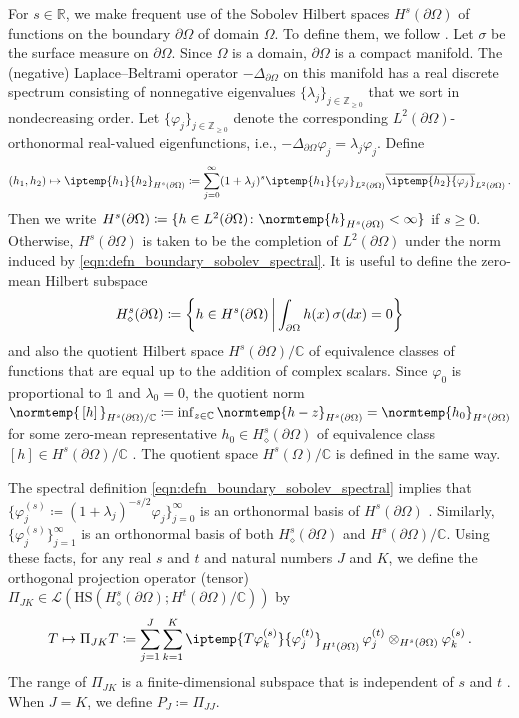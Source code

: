 \documentclass[pdflatex,sn-mathphys-num]{sn-jnl-preprint}
\let\originalleft\left %
\let\originalright\right
\renewcommand{\left}{\mathopen{}\mathclose\bgroup\originalleft}
\renewcommand{\right}{\aftergroup\egroup\originalright}
\newcommand{\Z}{\mathbb{Z}}
\newcommand{\R}{\mathbb{R}}
\newcommand{\C}{\mathbb{C}}
\newcommand{\sL}{\mathscr{L}}
\newcommand{\pOmega}{{\partial\Omega}}
\newcommand{\ip}{\iptemp}
\newcommand{\norm}{\normtemp}
\newcommand{\set}[2]{{\left\{ #1 \,\middle|\, #2 \right\}}}
\newcommand{\defeq}{\coloneqq} %
\newcommand{\HS}{\mathrm{HS}} %
\newcommand{\onebm}{\mathds{1}} %
\theoremstyle{thmstyleone}%
\theoremstyle{thmstyletwo}%
\theoremstyle{thmstylethree}%
\numberwithin{equation}{section}
\numberwithin{theorem}{section}
\begin{document}
For $s\in\R$, we make frequent use of the Sobolev Hilbert spaces $H^s(\pOmega)$ of functions on the boundary $\pOmega$ of domain $\Omega$. To define them, we follow \cite[Appendix~A, pp.~192--193]{abraham2019statistical}. Let $\sigma$ be the surface measure on $\pOmega$. Since $\Omega$ is a domain, $\pOmega$ is a compact manifold. The (negative) Laplace--Beltrami operator $-\Delta_{\pOmega}$ on this manifold has a real discrete spectrum consisting of nonnegative eigenvalues $\{\lambda_j\}_{j\in\Z_{\geq 0}}$ that we sort in nondecreasing order. Let $\{\varphi_j\}_{j\in\Z_{\geq 0}}$ denote the corresponding $L^2(\pOmega)$-orthonormal real-valued eigenfunctions, i.e., $-\Delta_{\pOmega}\varphi_j=\lambda_j\varphi_j$. Define
\begin{align}\label{eqn:defn_boundary_sobolev_spectral}
    (h_1,h_2)\mapsto \ip{h_1}{h_2}_{H^s(\pOmega)}\defeq \sum_{j=0}^\infty (1+\lambda_j)^s\ip{h_1}{\varphi_j}_{L^2(\pOmega)}\overline{\ip{h_2}{\varphi_j}}_{L^2(\pOmega)}\,.
\end{align}
Then we write $H^s(\pOmega)\defeq \{h\in L^2(\pOmega)\colon \norm{h}_{H^s(\pOmega)}<\infty\}$ if $s\geq 0$. Otherwise, $H^s(\pOmega)$ is taken to be the completion of $L^2(\pOmega)$ under the norm induced by \eqref{eqn:defn_boundary_sobolev_spectral}. It is useful to define the zero-mean Hilbert subspace
\begin{align}
    H_\diamond^{s}(\pOmega)\defeq \set{h\in H^{s}(\pOmega)}{\int_\pOmega h(x) \, \sigma(dx) = 0}
\end{align}
and also the quotient Hilbert space $H^s(\pOmega)/\C$ of equivalence classes of functions that are equal up to the addition of complex scalars. Since $\varphi_0$ is proportional to $\onebm$ and $\lambda_0=0$, the quotient norm $\norm{\,[h]\,}_{H^s(\pOmega)/\C}\defeq \inf_{z\in\C}\norm{h-z}_{H^s(\pOmega)}=\norm{h_0}_{H^s(\pOmega)}$ for some zero-mean representative $h_0\in H_\diamond^s(\pOmega)$ of equivalence class $[h]\in H^s(\pOmega)/\C$ \cite[Remark~3.5, pp.~1931--1932]{garde2022series}. The quotient space $H^s(\Omega)/\C$ is defined in the same way.

The spectral definition \eqref{eqn:defn_boundary_sobolev_spectral} implies that $\{\varphi^{(s)}_j\defeq (1+\lambda_j)^{-s/2}\varphi_j\}_{j=0}^\infty$ is an orthonormal basis of $H^s(\pOmega)$ \cite[p.~193, Remark i]{abraham2019statistical}. Similarly, $\{\varphi^{(s)}_j\}_{j=1}^\infty$ is an orthonormal basis of both $H_\diamond^s(\pOmega)$ and $H^s(\pOmega)/\C$. Using these facts, for any real $s$ and $t$ and natural numbers $J$ and $K$, we define the orthogonal projection operator (tensor) $\Pi_{JK}\in \sL(\HS(H^s_\diamond(\pOmega);H^t(\pOmega)/\C))$ by
\begin{align}\label{eqn:projection_operator}
    T\mapsto \Pi_{JK}T\defeq \sum_{j=1}^{J}\sum_{k=1}^K\ip{T \varphi_k^{(s)}}{\varphi_j^{(t)}}_{H^t(\pOmega)}\,
    \varphi_j^{(t)}\otimes_{H^s(\pOmega)}\varphi_k^{(s)}\,.
\end{align}
The range of $\Pi_{JK}$ is a finite-dimensional subspace that is independent of $s$ and $t$ \cite[Appendix~B, p.~194]{abraham2019statistical}. When $J=K$, we define $P_J\defeq \Pi_{JJ}$. 
\end{document}
